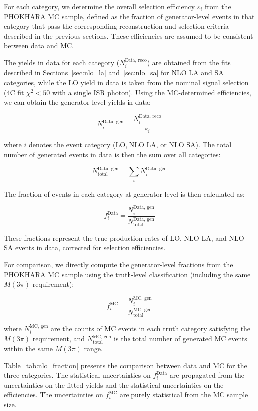 For each category, we determine the overall selection efficiency $\varepsilon_i$ from the PHOKHARA MC sample, defined as the fraction of generator-level events in that category that pass the corresponding reconstruction and selection criteria described in the previous sections. These efficiencies are assumed to be consistent between data and MC.

The yields in data for each category ($N_i^{\text{Data, reco}}$) are obtained from the fits described in Sections~\ref{sec:nlo_la} and~\ref{sec:nlo_sa} for NLO LA and SA categories, while the LO yield in data is taken from the nominal signal selection (4C fit $\chi^2 < 50$ with a single ISR photon). Using the MC-determined efficiencies, we can obtain the generator-level yields in data:

\[
    N_i^{\text{Data, gen}} = \frac{N_i^{\text{Data, reco}}}{\varepsilon_i}
\]

where $i$ denotes the event category (LO, NLO LA, or NLO SA). The total number of generated events in data is then the sum over all categories:

\[
    N_{\text{total}}^{\text{Data, gen}} = \sum_i N_i^{\text{Data, gen}}
\]

The fraction of events in each category at generator level is then calculated as:

\[
    f_i^{\text{Data}} = \frac{N_i^{\text{Data, gen}}}{N_{\text{total}}^{\text{Data, gen}}}
\]

These fractions represent the true production rates of LO, NLO LA, and NLO SA events in data, corrected for selection efficiencies.

For comparison, we directly compute the generator-level fractions from the PHOKHARA MC sample using the truth-level classification (including the same $M(3\pi)$ requirement):

\[
    f_i^{\text{MC}} = \frac{N_i^{\text{MC, gen}}}{N_{\text{total}}^{\text{MC, gen}}}
\]

where $N_i^{\text{MC, gen}}$ are the counts of MC events in each truth category satisfying the $M(3\pi)$ requirement, and $N_{\text{total}}^{\text{MC, gen}}$ is the total number of generated MC events within the same $M(3\pi)$ range.

Table~\ref{tab:nlo_fraction} presents the comparison between data and MC for the three categories. The statistical uncertainties on $f_i^{\text{Data}}$ are propagated from the uncertainties on the fitted yields and the statistical uncertainties on the efficiencies. The uncertainties on $f_i^{\text{MC}}$ are purely statistical from the MC sample size.

